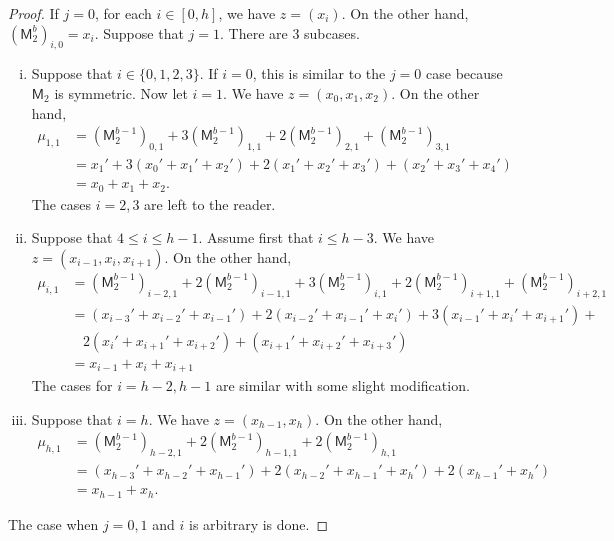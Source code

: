 \documentclass[12pt,reqno]{amsart}
\renewcommand{\leq}{\leqslant}
\newcommand{\M}{\mathsf{M}}
\theoremstyle{definition}
\numberwithin{equation}{section}
\begin{document}
\begin{proof}
    If $j=0$, for each $i\in [0,h]$, we have $z=(x_i)$. On the other hand, $(\M_2^b)_{i,0}=x_i$. Suppose that $j=1$. There are 3 subcases.
    \begin{enumerate}[(i)]
      \item Suppose that $i\in \{0,1,2,3\}$. If $i=0$, this is similar to the $j=0$ case because $\M_2$ is symmetric. Now let $i=1$. We have $z=(x_0,x_1,x_2)$. On the other hand, 
          \begin{align*} 
          \mu_{1,1}&= (\M_2^{b-1})_{0,1}+3(\M_2^{b-1})_{1,1}+ 2(\M_2^{b-1})_{2,1}+(\M_2^{b-1})_{3,1}\\
          &=x_1'+3(x_0'+x_1'+x_2')+2(x_1'+x_2'+x_3')+ (x_2'+x_3'+x_4')\\
          &=x_0+x_1+x_2.
          \end{align*} The cases $i=2,3$ are left to the reader. 
      \item Suppose that $4\leq i\leq h-1$. Assume first that $i\leq h-3$. We have $z=(x_{i-1},x_i,x_{i+1})$. On the other hand, 
          \begin{align*} 
          \mu_{i,1}&=
          (\M_2^{b-1})_{i-2,1}+2(\M_2^{b-1})_{i-1,1}+ 3(\M_2^{b-1})_{i,1}+2(\M_2^{b-1})_{i+1,1}+ (\M_2^{b-1})_{i+2,1}\\
          &=(x_{i-3}'+x_{i-2}'+x_{i-1}')+ 2(x_{i-2}'+x_{i-1}'+x_i')+ 3(x_{i-1}'+x_i'+x_{i+1}')+ \\ &\ \ \ \ 2(x_i'+x_{i+1}'+x_{i+2}')+ (x_{i+1}'+x_{i+2}'+x_{i+3}')\\
          &=x_{i-1}+x_i+x_{i+1}
          \end{align*} The cases for $i=h-2,h-1$ are similar with some slight modification. 
      \item Suppose that $i=h$. We have $z=(x_{h-1},x_h)$. On the other hand, 
          \begin{align*}
            \mu_{h,1}&=(\M_2^{b-1})_{h-2,1}+ 2(\M_2^{b-1})_{h-1,1}+ 2(\M_2^{b-1})_{h,1}\\
            &=(x_{h-3}'+x_{h-2}'+x_{h-1}')+ 2(x_{h-2}'+x_{h-1}'+x_h')+2(x_{h-1}'+x_h')\\
            &=x_{h-1}+x_h.
          \end{align*}
    \end{enumerate} The case when $j=0,1$ and $i$ is arbitrary is done.
    

\end{proof}
\end{document}
